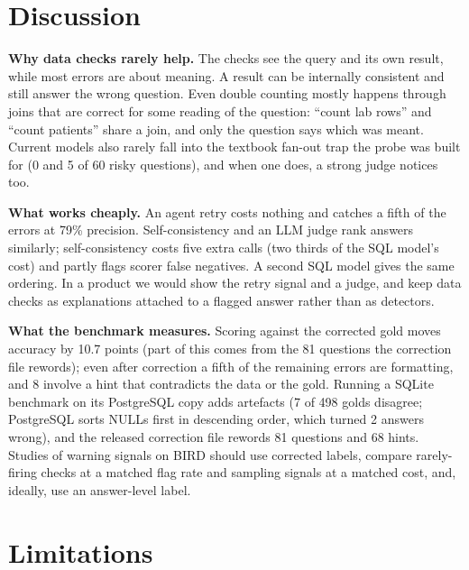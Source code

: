 \documentclass[10pt,twocolumn]{article}
\begin{document}
\section{Discussion}

\textbf{Why data checks rarely help.} The checks see the query and its own result, while most errors
are about meaning. A result can be internally consistent and still answer the wrong question. Even
double counting mostly happens through joins that are correct for some reading of the question:
``count lab rows'' and ``count patients'' share a join, and only the question says which was meant. Current
models also rarely fall into the textbook fan-out trap the probe was built for (0 and 5 of 60 risky
questions), and when one does, a strong judge notices too.

\textbf{What works cheaply.} An agent retry costs nothing and catches a fifth of the errors at 79\%
precision. Self-consistency and an LLM judge rank answers similarly; self-consistency costs five extra
calls (two thirds of the SQL model's cost) and partly flags scorer false negatives. A second SQL model
gives the same ordering. In a product we would show the retry signal and a judge, and keep data checks as explanations
attached to a flagged answer rather than as detectors.

\textbf{What the benchmark measures.} Scoring against the corrected gold moves accuracy by 10.7
points (part of this comes from the 81 questions the correction file rewords); even after
correction a fifth of the remaining errors are formatting, and 8 involve a hint that contradicts the
data or the gold. Running a SQLite benchmark on its PostgreSQL copy adds artefacts (7 of 498 golds
disagree; PostgreSQL sorts NULLs first in descending order, which turned 2 answers wrong), and the
released correction file rewords 81 questions and 68 hints. Studies of warning signals on BIRD should
use corrected labels, compare rarely-firing checks at a matched flag rate and sampling signals at a
matched cost, and, ideally, use an answer-level label.

\section*{Limitations}
\end{document}
